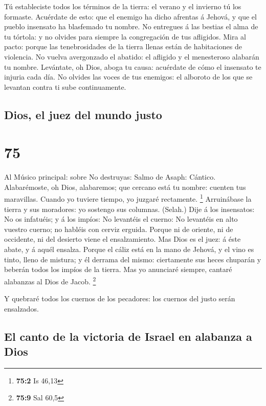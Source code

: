  Tú estableciste todos los términos de la tierra: el verano
y el invierno tú los formaste.  Acuérdate de esto: que el
enemigo ha dicho afrentas á Jehová, y que el pueblo insensato ha
blasfemado tu nombre.  No entregues á las bestias el alma
de tu tórtola: y no olvides para siempre la congregación de tus
afligidos.  Mira al pacto: porque las tenebrosidades de la
tierra llenas están de habitaciones de violencia.  No
vuelva avergonzado el abatido: el afligido y el menesteroso alabarán tu
nombre.  Levántate, oh Dios, aboga tu causa: acuérdate de
cómo el insensato te injuria cada día.  No olvides las
voces de tus enemigos: el alboroto de los que se levantan contra ti sube
continuamente.

\hypertarget{dios-el-juez-del-mundo-justo}{%
\subsection{Dios, el juez del mundo
justo}\label{dios-el-juez-del-mundo-justo}}

\hypertarget{section-74}{%
\section{75}\label{section-74}}

 Al Músico principal: sobre No destruyas: Salmo de Asaph:
Cántico. Alabarémoste, oh Dios, alabaremos; que cercano está tu nombre:
cuenten tus maravillas.  Cuando yo tuviere tiempo, yo
juzgaré rectamente. \footnote{\textbf{75:2} Is 46,13} 
Arruinábase la tierra y sus moradores: yo sostengo sus columnas.
(Selah.)  Dije á los insensatos: No os infatuéis; y á los
impíos: No levantéis el cuerno:  No levantéis en alto
vuestro cuerno; no habléis con cerviz erguida.  Porque ni de
oriente, ni de occidente, ni del desierto viene el ensalzamiento.
 Mas Dios es el juez: á éste abate, y á aquél ensalza.
 Porque el cáliz está en la mano de Jehová, y el vino es
tinto, lleno de mistura; y él derrama del mismo: ciertamente sus heces
chuparán y beberán todos los impíos de la tierra.  Mas yo
anunciaré siempre, cantaré alabanzas al Dios de Jacob. \footnote{\textbf{75:9}
  Sal 60,5}

 Y quebraré todos los cuernos de los pecadores: los cuernos
del justo serán ensalzados.

\hypertarget{el-canto-de-la-victoria-de-israel-en-alabanza-a-dios}{%
\subsection{El canto de la victoria de Israel en alabanza a
Dios}\label{el-canto-de-la-victoria-de-israel-en-alabanza-a-dios}}

